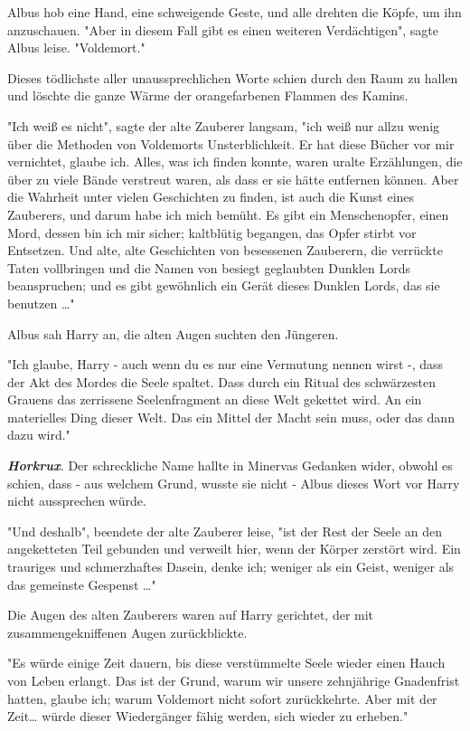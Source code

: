 {Albus hob eine Hand, eine schweigende Geste, und alle drehten die Köpfe, um ihn anzuschauen. "Aber in diesem Fall gibt es einen weiteren Verdächtigen", sagte Albus leise. "Voldemort."

Dieses tödlichste aller unaussprechlichen Worte schien durch den Raum zu hallen und löschte die ganze Wärme der orangefarbenen Flammen des Kamins.

"Ich weiß es nicht", sagte der alte Zauberer langsam, "ich weiß nur allzu wenig über die Methoden von Voldemorts Unsterblichkeit. Er hat diese Bücher vor mir vernichtet, glaube ich. Alles, was ich finden konnte, waren uralte Erzählungen, die über zu viele Bände verstreut waren, als dass er sie hätte entfernen können. Aber die Wahrheit unter vielen Geschichten zu finden, ist auch die Kunst eines Zauberers, und darum habe ich mich bemüht. Es gibt ein Menschenopfer, einen Mord, dessen bin ich mir sicher; kaltblütig begangen, das Opfer stirbt vor Entsetzen. Und alte, alte Geschichten von besessenen Zauberern, die verrückte Taten vollbringen und die Namen von besiegt geglaubten Dunklen Lords beanspruchen; und es gibt gewöhnlich ein Gerät dieses Dunklen Lords, das sie benutzen …"

Albus sah Harry an, die alten Augen suchten den Jüngeren.

"Ich glaube, Harry - auch wenn du es nur eine Vermutung nennen wirst -, dass der Akt des Mordes die Seele spaltet. Dass durch ein Ritual des schwärzesten Grauens das zerrissene Seelenfragment an diese Welt gekettet wird. An ein materielles Ding dieser Welt. Das ein Mittel der Macht sein muss, oder das dann dazu wird."

\textbf{\emph{Horkrux}}. Der schreckliche Name hallte in Minervas Gedanken wider, obwohl es schien, dass - aus welchem Grund, wusste sie nicht - Albus dieses Wort vor Harry nicht aussprechen würde.

"Und deshalb", beendete der alte Zauberer leise, "ist der Rest der Seele an den angeketteten Teil gebunden und verweilt hier, wenn der Körper zerstört wird. Ein trauriges und schmerzhaftes Dasein, denke ich; weniger als ein Geist, weniger als das gemeinste Gespenst …"

Die Augen des alten Zauberers waren auf Harry gerichtet, der mit zusammengekniffenen Augen zurückblickte.

"Es würde einige Zeit dauern, bis diese verstümmelte Seele wieder einen Hauch von Leben erlangt. Das ist der Grund, warum wir unsere zehnjährige Gnadenfrist hatten, glaube ich; warum Voldemort nicht sofort zurückkehrte. Aber mit der Zeit… würde dieser Wiedergänger fähig werden, sich wieder zu erheben."

}
